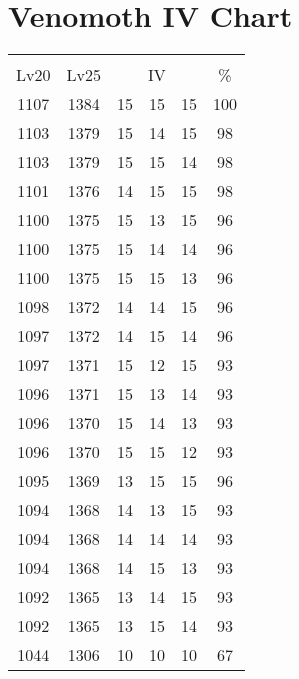 \documentclass{article}%
\begin{document}
%
\normalsize%
\section{Venomoth IV Chart}%
\label{sec:Venomoth IV Chart}%
\renewcommand{\arraystretch}{1.5}%
\begin{tabular}{|c|c|c|c|c|c|}%
\hline%
\multicolumn{6}{|c|}{\textcolor{white}{ 
\linebreak{Venomoth}
}%
\cellcolor{black}}\\%
\multicolumn{1}{|c}{Lv20}&\multicolumn{1}{c|}{Lv25}&\multicolumn{3}{c|}{IV}&\multicolumn{1}{|c|}{\%}\\%
\hline%
\rowcolor{color100}%
1107&1384&15&15&15&100\\%
\hline%
\rowcolor{color98}%
1103&1379&15&14&15&98\\%
\hline%
\rowcolor{color98}%
1103&1379&15&15&14&98\\%
\hline%
\rowcolor{color98}%
1101&1376&14&15&15&98\\%
\hline%
\rowcolor{color96}%
1100&1375&15&13&15&96\\%
\hline%
\rowcolor{color96}%
1100&1375&15&14&14&96\\%
\hline%
\rowcolor{color96}%
1100&1375&15&15&13&96\\%
\hline%
\rowcolor{color96}%
1098&1372&14&14&15&96\\%
\hline%
\rowcolor{color96}%
1097&1372&14&15&14&96\\%
\hline%
\rowcolor{color93}%
1097&1371&15&12&15&93\\%
\hline%
\rowcolor{color93}%
1096&1371&15&13&14&93\\%
\hline%
\rowcolor{color93}%
1096&1370&15&14&13&93\\%
\hline%
\rowcolor{color93}%
1096&1370&15&15&12&93\\%
\hline%
\rowcolor{color96}%
1095&1369&13&15&15&96\\%
\hline%
\rowcolor{color93}%
1094&1368&14&13&15&93\\%
\hline%
\rowcolor{color93}%
1094&1368&14&14&14&93\\%
\hline%
\rowcolor{color93}%
1094&1368&14&15&13&93\\%
\hline%
\rowcolor{color93}%
1092&1365&13&14&15&93\\%
\hline%
\rowcolor{color93}%
1092&1365&13&15&14&93\\%
\hline%
\rowcolor{color91}%
1044&1306&10&10&10&67\\%
\end{tabular}

%
\end{document}
